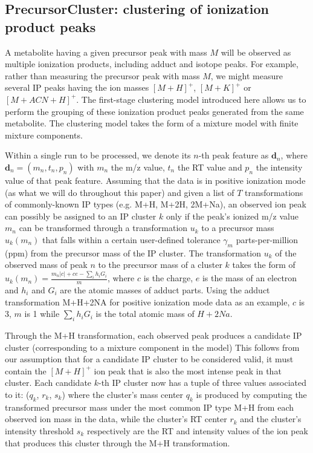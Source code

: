 \subsection{PrecursorCluster: clustering of ionization product peaks\label{sub:ip-clustering}}

A metabolite having a given precursor peak with mass $M$ will be observed as multiple ionization products, including adduct and isotope peaks. For example, rather than measuring the precursor peak with mass $M$, we might measure several IP peaks having the ion masses $[M+H]^+$, $[M+K]^+$ or $[M+ACN+H]^+$. The first-stage clustering model introduced here allows us to perform the grouping of these ionization product peaks generated from the same metabolite. The clustering model takes the form of a mixture model with finite mixture components. 

Within a single run to be processed, we denote its $n$-th peak feature as $\textbf{d}_n$, where $\boldsymbol{d}_n=(m_n,t_n,p_n)$ with $m_n$ the m/z value, $t_n$ the RT value and $p_n$ the intensity value of that peak feature. Assuming that the data is in positive ionization mode (as what we will do throughout this paper) and given a list of $T$ transformations of commonly-known IP types (e.g. M+H, M+2H, 2M+Na), an observed ion peak can possibly be assigned to an IP cluster $k$ only if the peak's ionized m/z value $m_n $ can be transformed through a transformation $u_k$ to a precursor mass $u_k(m_n)$ that falls within a certain user-defined tolerance $\gamma_m$ parts-per-million (ppm) from the precursor mass of the IP cluster. The transformation $u_k$ of the observed mass of peak $n$ to the precursor mass of a cluster $k$ takes the form of $u_k(m_n) = \frac{m_n|c|+ce-\sum_{i} h_i G_i}{m}$, where $c$ is the charge, $e$ is the mass of an electron and $h_i$ and $G_i$ are the atomic masses of adduct parts. Using the adduct transformation M+H+2NA for positive ionization mode data as an example, $c$ is 3, $m$ is 1 while $\sum_{i} h_i G_i$ is the total atomic mass of $H+2Na$. 

Through the M+H transformation, each observed peak produces a candidate IP cluster (corresponding to a mixture component in the model)  This follows from our assumption that for a candidate IP cluster to be considered valid, it must contain the $[M+H]^+$ ion peak that is also the most intense peak in that cluster. Each candidate $k$-th IP cluster now has a tuple of three values associated to it: ($q_k$, $r_k$, $s_k$) where the cluster's mass center $q_k$ is produced by computing the transformed precursor mass under the most common IP type M+H from each observed ion mass in the data, while the cluster's RT center $r_k$ and the cluster's intensity threshold $s_k$ respectively are the RT and intensity values of the ion peak that produces this cluster through the M+H transformation. 

